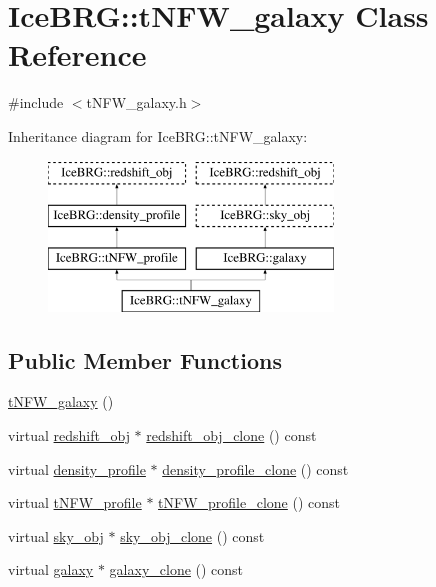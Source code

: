 \hypertarget{classIceBRG_1_1tNFW__galaxy}{}\section{Ice\+B\+R\+G\+:\+:t\+N\+F\+W\+\_\+galaxy Class Reference}
\label{classIceBRG_1_1tNFW__galaxy}


{\ttfamily \#include $<$t\+N\+F\+W\+\_\+galaxy.\+h$>$}

Inheritance diagram for Ice\+B\+R\+G\+:\+:t\+N\+F\+W\+\_\+galaxy\+:\begin{figure}[H]
\begin{center}
\leavevmode
\includegraphics[height=4.000000cm]{classIceBRG_1_1tNFW__galaxy}
\end{center}
\end{figure}
\subsection*{Public Member Functions}
\begin{DoxyCompactItemize}
\item 
\hyperlink{classIceBRG_1_1tNFW__galaxy_af5746ad63480a59b1fa080be9ea280f4}{t\+N\+F\+W\+\_\+galaxy} ()
\item 
virtual \hyperlink{classIceBRG_1_1redshift__obj}{redshift\+\_\+obj} $\ast$ \hyperlink{classIceBRG_1_1tNFW__galaxy_a0ac2852b6fad29184222f58e18aff3b3}{redshift\+\_\+obj\+\_\+clone} () const 
\item 
virtual \hyperlink{classIceBRG_1_1density__profile}{density\+\_\+profile} $\ast$ \hyperlink{classIceBRG_1_1tNFW__galaxy_aa571e02cd48ac9f97f205077d29dfcf5}{density\+\_\+profile\+\_\+clone} () const 
\item 
virtual \hyperlink{classIceBRG_1_1tNFW__profile}{t\+N\+F\+W\+\_\+profile} $\ast$ \hyperlink{classIceBRG_1_1tNFW__galaxy_ae9fa3a91d493e1763ffd01b0f454df29}{t\+N\+F\+W\+\_\+profile\+\_\+clone} () const 
\item 
virtual \hyperlink{classIceBRG_1_1sky__obj}{sky\+\_\+obj} $\ast$ \hyperlink{classIceBRG_1_1tNFW__galaxy_a6699f38c68e4d330a68c2319e9429138}{sky\+\_\+obj\+\_\+clone} () const 
\item 
virtual \hyperlink{classIceBRG_1_1galaxy}{galaxy} $\ast$ \hyperlink{classIceBRG_1_1tNFW__galaxy_a636dcf8380204b86e7d850ba2465a3c1}{galaxy\+\_\+clone} () const 
\end{DoxyCompactItemize}
